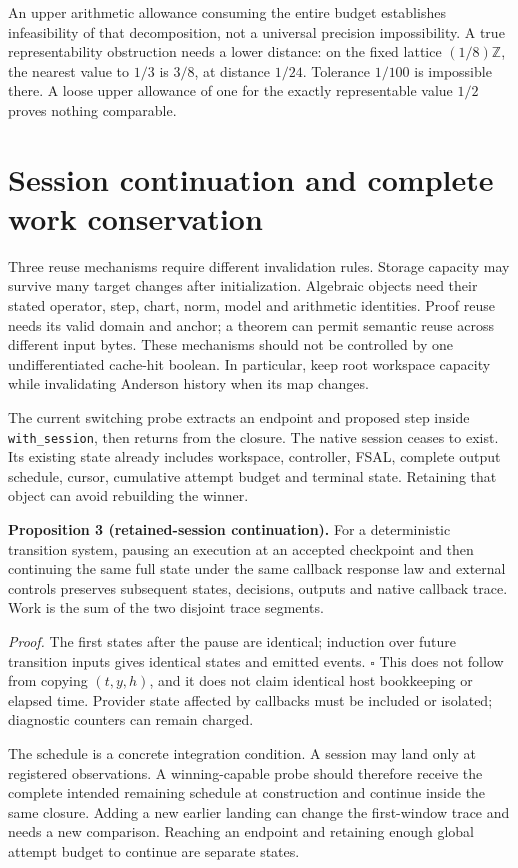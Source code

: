 \documentclass[aps,pra,reprint,onecolumn,10pt,notitlepage,nofootinbib]{revtex4-2}
\begin{document}
An upper arithmetic allowance consuming the entire budget establishes
infeasibility of that decomposition, not a universal precision impossibility.
A true representability obstruction needs a lower distance: on the fixed
lattice $(1/8)\mathbb Z$, the nearest value to $1/3$ is $3/8$, at distance
$1/24$. Tolerance $1/100$ is impossible there. A loose upper allowance of one
for the exactly representable value $1/2$ proves nothing comparable.

\section{Session continuation and complete work conservation}

Three reuse mechanisms require different invalidation rules. Storage capacity
may survive many target changes after initialization. Algebraic objects need
their stated operator, step, chart, norm, model and arithmetic identities.
Proof reuse needs its valid domain and anchor; a theorem can permit semantic
reuse across different input bytes. These mechanisms should not be controlled
by one undifferentiated cache-hit boolean. In particular, keep root workspace
capacity while invalidating Anderson history when its map changes.

The current switching probe extracts an endpoint and proposed step inside
\texttt{with\_session}, then returns from the closure. The native session
ceases to exist. Its existing state already includes workspace, controller,
FSAL, complete output schedule, cursor, cumulative attempt budget and terminal
state. Retaining that object can avoid rebuilding the winner.

\textbf{Proposition 3 (retained-session continuation).} For a deterministic
transition system, pausing an execution at an accepted checkpoint and then
continuing the same full state under the same callback response law and
external controls preserves subsequent states, decisions, outputs and native
callback trace. Work is the sum of the two disjoint trace segments.

\emph{Proof.} The first states after the pause are identical; induction over
future transition inputs gives identical states and emitted events.
\hfill$\square$ This does not follow from copying $(t,y,h)$, and it does not
claim identical host bookkeeping or elapsed time. Provider state affected by
callbacks must be included or isolated; diagnostic counters can remain charged.

The schedule is a concrete integration condition. A session may land only at
registered observations. A winning-capable probe should therefore receive
the complete intended remaining schedule at construction and continue inside
the same closure. Adding a new earlier landing can change the first-window
trace and needs a new comparison. Reaching an endpoint and retaining enough
global attempt budget to continue are separate states.
\end{document}

